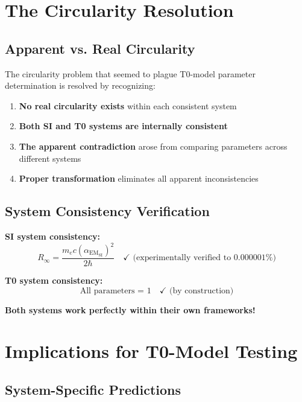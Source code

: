 \documentclass[12pt,a4paper]{article}
\newcommand{\alphaEM}{\alpha_{\text{EM}}}
\newcommand{\Rzero}{R_\infty}
\begin{document}
	\section{The Circularity Resolution}
	\label{sec:circularity_resolution}
	
	\subsection{Apparent vs. Real Circularity}
	\label{subsec:apparent_real_circularity}
	
	The circularity problem that seemed to plague T0-model parameter determination is resolved by recognizing:
	
	\begin{enumerate}
		\item \textbf{No real circularity exists} within each consistent system
		\item \textbf{Both SI and T0 systems are internally consistent}
		\item \textbf{The apparent contradiction} arose from comparing parameters across different systems
		\item \textbf{Proper transformation} eliminates all apparent inconsistencies
	\end{enumerate}
	
	\subsection{System Consistency Verification}
	\label{subsec:system_consistency}
	
	\textbf{SI system consistency:}
	$$\Rzero = \frac{m_e c \left(\alphaEM_{\text{SI}}\right)^2}{2\hbar} \quad \checkmark \text{ (experimentally verified to 0.000001\%)}$$
	
	\textbf{T0 system consistency:}
	$$\text{All parameters = 1} \quad \checkmark \text{ (by construction)}$$
	
	\textbf{Both systems work perfectly within their own frameworks!}
	
	\section{Implications for T0-Model Testing}
	\label{sec:testing_implications}
	
	\subsection{System-Specific Predictions}
	\label{subsec:system_specific_predictions}
	
\end{document}
